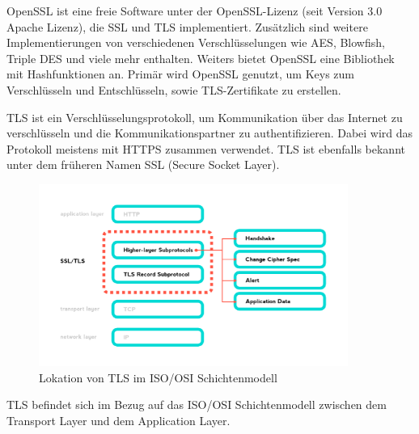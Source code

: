 
OpenSSL ist eine freie Software unter der OpenSSL-Lizenz (seit Version 3.0 Apache Lizenz), die SSL und TLS implementiert. Zusätzlich sind weitere Implementierungen von verschiedenen Verschlüsselungen wie AES, Blowfish, Triple DES und viele mehr enthalten. Weiters bietet OpenSSL eine Bibliothek mit Hashfunktionen an. Primär wird OpenSSL genutzt, um Keys zum Verschlüsseln und Entschlüsseln, sowie TLS-Zertifikate zu erstellen. 



TLS ist ein Verschlüsselungsprotokoll, um Kommunikation über das Internet zu verschlüsseln und die Kommunikationspartner zu authentifizieren. Dabei wird das Protokoll meistens mit HTTPS zusammen verwendet. TLS ist ebenfalls bekannt unter dem früheren Namen SSL (Secure Socket Layer).  

\begin{figure}[H]
    \centering
    \includegraphics[width=0.9\textwidth]{media/OpenSSL/info.png}
    \caption{Lokation von TLS im ISO/OSI Schichtenmodell \cite{BreakDownTLS}}
\end{figure}

TLS befindet sich im Bezug auf das ISO/OSI Schichtenmodell zwischen dem Transport Layer und dem Application Layer.


